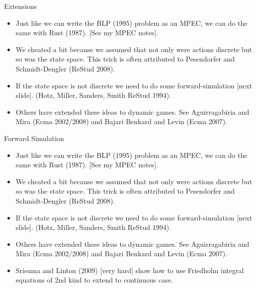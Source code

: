 \documentclass[xcolor=pdftex,dvipsnames,table,mathserif]{beamer}
\begin{document}
\begin{frame}{Extensions}
\begin{itemize}
\item Just like we can write the BLP (1995) problem as an \alert{MPEC}, we can do the same with Rust (1987). [See my MPEC notes].
\item We cheated a bit because we assumed that not only were actions discrete but so was the state space. This trick is often attributed to Pesendorfer and Schmidt-Dengler (ReStud 2008).
\item If the state space is not discrete we need to do some forward-simulation [next slide]. (Hotz, Miller, Sanders, Smith ReStud 1994).
\item Others have extended these ideas to \alert{dynamic games}. See Aguirragabiria and Mira (Ecma 2002/2008) and Bajari Benkard and Levin (Ecma 2007).
\end{itemize}
\end{frame}

\begin{frame}{Forward Simulation}
\begin{itemize}
\item Just like we can write the BLP (1995) problem as an \alert{MPEC}, we can do the same with Rust (1987). [See my MPEC notes].
\item We cheated a bit because we assumed that not only were actions discrete but so was the state space. This trick is often attributed to Pesendorfer and Schmidt-Dengler (ReStud 2008).
\item If the state space is not discrete we need to do some forward-simulation [next slide]. (Hotz, Miller, Sanders, Smith ReStud 1994).
\item Others have extended these ideas to \alert{dynamic games}. See Aguirragabiria and Mira (Ecma 2002/2008) and Bajari Benkard and Levin (Ecma 2007).
\item Srisuma and Linton (2009) [very hard] show how to use Friedholm integral equations of 2nd kind to extend to continuous case.
\end{itemize}
\end{frame}
\end{document}
